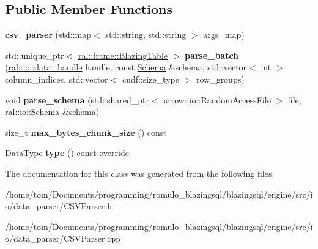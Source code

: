 \subsection*{Public Member Functions}
\begin{DoxyCompactItemize}
\item 
\mbox{\label{classral_1_1io_1_1csv__parser_a968d6e3184638dfb497d4ac8a3080d1f}} 
{\bfseries csv\+\_\+parser} (std\+::map$<$ std\+::string, std\+::string $>$ args\+\_\+map)
\item 
\mbox{\label{classral_1_1io_1_1csv__parser_aa5f2a8243cc1897ec38162f5955e1265}} 
std\+::unique\+\_\+ptr$<$ \hyperlink{classral_1_1frame_1_1BlazingTable}{ral\+::frame\+::\+Blazing\+Table} $>$ {\bfseries parse\+\_\+batch} (\hyperlink{structral_1_1io_1_1data__handle}{ral\+::io\+::data\+\_\+handle} handle, const \hyperlink{classral_1_1io_1_1Schema}{Schema} \&schema, std\+::vector$<$ int $>$ column\+\_\+indices, std\+::vector$<$ cudf\+::size\+\_\+type $>$ row\+\_\+groups)
\item 
\mbox{\label{classral_1_1io_1_1csv__parser_ae9d6249732a74e43c231257b7a84334b}} 
void {\bfseries parse\+\_\+schema} (std\+::shared\+\_\+ptr$<$ arrow\+::io\+::\+Random\+Access\+File $>$ file, \hyperlink{classral_1_1io_1_1Schema}{ral\+::io\+::\+Schema} \&schema)
\item 
\mbox{\label{classral_1_1io_1_1csv__parser_af4f12c1bd8eada1c5ac6bfbc99ea0f6d}} 
size\+\_\+t {\bfseries max\+\_\+bytes\+\_\+chunk\+\_\+size} () const
\item 
\mbox{\label{classral_1_1io_1_1csv__parser_a037073b233a35609fb13a00e295c959c}} 
Data\+Type {\bfseries type} () const override
\end{DoxyCompactItemize}


The documentation for this class was generated from the following files\+:\begin{DoxyCompactItemize}
\item 
/home/tom/\+Documents/programming/romulo\+\_\+blazingsql/blazingsql/engine/src/io/data\+\_\+parser/C\+S\+V\+Parser.\+h\item 
/home/tom/\+Documents/programming/romulo\+\_\+blazingsql/blazingsql/engine/src/io/data\+\_\+parser/C\+S\+V\+Parser.\+cpp\end{DoxyCompactItemize}
